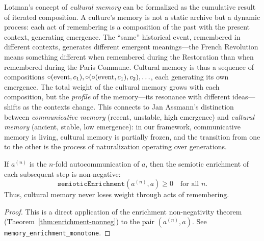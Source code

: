 \begin{remark}
Lotman's concept of \emph{cultural memory} can be formalized as the cumulative result of iterated composition. A culture's memory is not a static archive but a dynamic process: each act of remembering is a composition of the past with the present context, generating emergence. The ``same'' historical event, remembered in different contexts, generates different emergent meanings---the French Revolution means something different when remembered during the Restoration than when remembered during the Paris Commune. Cultural memory is thus a sequence of compositions $\circ(\text{event}, c_1), \circ(\circ(\text{event}, c_1), c_2), \ldots$, each generating its own emergence. The total weight of the cultural memory grows with each composition, but the \emph{profile} of the memory---its resonance with different ideas---shifts as the contexts change. This connects to Jan Assmann's distinction between \emph{communicative memory} (recent, unstable, high emergence) and \emph{cultural memory} (ancient, stable, low emergence): in our framework, communicative memory is living, cultural memory is partially frozen, and the transition from one to the other is the process of naturalization operating over generations.
\end{remark}

\begin{theorem}
\label{thm:memory-enrichment}
If $a^{(n)}$ is the $n$-fold autocommunication of $a$, then the semiotic enrichment of each subsequent step is non-negative:
\[
  \texttt{semioticEnrichment}(a^{(n)}, a) \geq 0 \quad \text{for all } n.
\]
Thus, cultural memory never loses weight through acts of remembering.
\end{theorem}

\begin{proof}
This is a direct application of the enrichment non-negativity theorem (Theorem~\ref{thm:enrichment-nonneg}) to the pair $(a^{(n)}, a)$. See \texttt{memory\_enrichment\_monotone}.
\end{proof}

